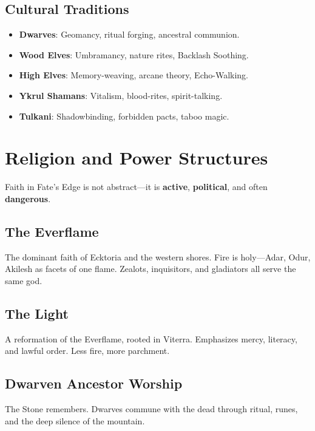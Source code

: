 \subsection*{Cultural Traditions}

\begin{itemize}
    \item \textbf{Dwarves}: Geomancy, ritual forging, ancestral communion.
    \item \textbf{Wood Elves}: Umbramancy, nature rites, Backlash Soothing.
    \item \textbf{High Elves}: Memory-weaving, arcane theory, Echo-Walking.
    \item \textbf{Ykrul Shamans}: Vitalism, blood-rites, spirit-talking.
    \item \textbf{Tulkani}: Shadowbinding, forbidden pacts, taboo magic.
\end{itemize}

\section*{Religion and Power Structures}

Faith in Fate's Edge is not abstract---it is \textbf{active}, \textbf{political}, and often \textbf{dangerous}.

\subsection*{The Everflame}

The dominant faith of Ecktoria and the western shores. Fire is holy---Adar, Odur, Akilesh as facets of one flame. Zealots, inquisitors, and gladiators all serve the same god.

\subsection*{The Light}

A reformation of the Everflame, rooted in Viterra. Emphasizes mercy, literacy, and lawful order. Less fire, more parchment.

\subsection*{Dwarven Ancestor Worship}

The Stone remembers. Dwarves commune with the dead through ritual, runes, and the deep silence of the mountain.

